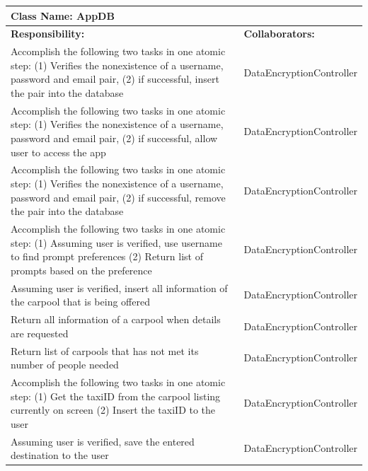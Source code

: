 \documentclass[]{article}
\begin{document}
	\begin{table}[H]
	\centering
	\begin{tabular}{|p{6cm}|p{6cm}|}
	\hline 
		\multicolumn{2}{|l|}{\textbf{Class Name: AppDB}} \\
	\hline
	\textbf{Responsibility:} & \textbf{Collaborators:} \\
	\hline
	Accomplish the following two tasks in one atomic step: (1) Verifies the nonexistence of a username, password and email pair, (2) if successful, insert the pair into the database & DataEncryptionController \\ \hline
	Accomplish the following two tasks in one atomic step: (1) Verifies the nonexistence of a username, password and email pair, (2) if successful, allow user to access the app & DataEncryptionController\\ \hline
	Accomplish the following two tasks in one atomic step: (1) Verifies the nonexistence of a username, password and email pair, (2) if successful, remove the pair into the database & DataEncryptionController\\ \hline
	Accomplish the following two tasks in one atomic step: (1) Assuming user is verified, use username to find prompt preferences (2) Return list of prompts based on the preference & DataEncryptionController\\ \hline
	Assuming user is verified, insert all information of the carpool that is being offered & DataEncryptionController\\ \hline
	Return all information of a carpool when details are requested & DataEncryptionController\\ \hline
	Return list of carpools that has not met its number of people needed & DataEncryptionController\\ \hline
	Accomplish the following two tasks in one atomic step: (1) Get the taxiID from the carpool listing currently on screen (2) Insert the taxiID to the user & DataEncryptionController\\ \hline
	Assuming user is verified, save the entered destination to the user & DataEncryptionController\\ \hline
	\end{tabular}
	\end{table}%

\appendix
\end{document}
